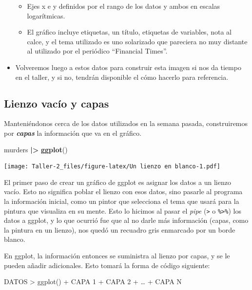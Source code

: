 \documentclass[
]{article}
\newenvironment{Shaded}{\begin{snugshade}}{\end{snugshade}}
\newcommand{\FunctionTok}[1]{\textcolor[rgb]{0.13,0.29,0.53}{\textbf{#1}}}
\newcommand{\NormalTok}[1]{#1}
\newcommand{\SpecialCharTok}[1]{\textcolor[rgb]{0.81,0.36,0.00}{\textbf{#1}}}
\providecommand{\tightlist}{%
  \setlength{\itemsep}{0pt}\setlength{\parskip}{0pt}}
\begin{document}
\begin{itemize}
  \begin{itemize}
  \tightlist
  \item
    Ejes x e y definidos por el rango de los datos y ambos en escalas
    logarítmicas.\\
  \item
    El gráfico incluye etiquetas, un título, etiquetas de variables,
    nota al calce, y el tema utilizado es uno solarizado que pareciera
    no muy distante al utilizado por el periódico ``Financial Times''.
  \end{itemize}
\item
  Volveremos luego a estos datos para construir esta imagen si nos da
  tiempo en el taller, y si no, tendrán disponible el cómo hacerlo para
  referencia.
\end{itemize}

\subsection{Lienzo vacío y capas}\label{lienzo-vacuxedo-y-capas}

Manteniéndonos cerca de los datos utilizados en la semana pasada,
construiremos por \textbf{\emph{capas}} la información que va en el
gráfico.

\begin{Shaded}
\begin{Highlighting}[]
\NormalTok{murders }\SpecialCharTok{|\textgreater{}} \FunctionTok{ggplot}\NormalTok{()}
\end{Highlighting}
\end{Shaded}

\texttt{[image: Taller-2\_files/figure-latex/Un lienzo en blanco-1.pdf]}

El primer paso de crear un gráfico de ggplot es asignar los datos a un
lienzo vacío. Esto no significa poblar el lienzo con esos datos, sino
pasarle al programa la información inicial, como un pintor que
selecciona el tema que usará para la pintura que visualiza en su mente.
Esto lo hicimos al pasar el \emph{pipe}
(\texttt{\textbar{}\textgreater{}} o \texttt{\%\textgreater{}\%}) los
datos a ggplot, y lo que ocurrió fue que al no darle más información
(capas, como la pintura en un lienzo), nos quedó un recuadro gris
enmarcado por un borde blanco.

En ggplot, la información entonces se suministra al lienzo por capas, y
se le pueden añadir adicionales. Esto tomará la forma de código
siguiente:

DATOS \textbar\textgreater{} ggplot() + CAPA 1 + CAPA 2 + \ldots{} +
CAPA N
\end{document}
